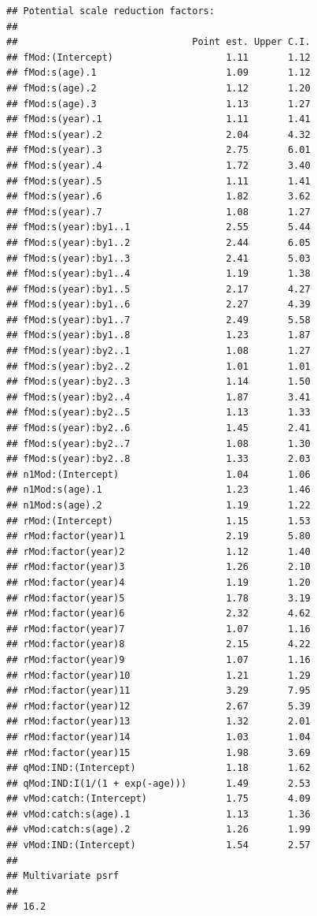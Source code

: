 \documentclass[
]{book}
\begin{document}
\begin{verbatim}
## Potential scale reduction factors:
## 
##                               Point est. Upper C.I.
## fMod:(Intercept)                    1.11       1.12
## fMod:s(age).1                       1.09       1.12
## fMod:s(age).2                       1.12       1.20
## fMod:s(age).3                       1.13       1.27
## fMod:s(year).1                      1.11       1.41
## fMod:s(year).2                      2.04       4.32
## fMod:s(year).3                      2.75       6.01
## fMod:s(year).4                      1.72       3.40
## fMod:s(year).5                      1.11       1.41
## fMod:s(year).6                      1.82       3.62
## fMod:s(year).7                      1.08       1.27
## fMod:s(year):by1..1                 2.55       5.44
## fMod:s(year):by1..2                 2.44       6.05
## fMod:s(year):by1..3                 2.41       5.03
## fMod:s(year):by1..4                 1.19       1.38
## fMod:s(year):by1..5                 2.17       4.27
## fMod:s(year):by1..6                 2.27       4.39
## fMod:s(year):by1..7                 2.49       5.58
## fMod:s(year):by1..8                 1.23       1.87
## fMod:s(year):by2..1                 1.08       1.27
## fMod:s(year):by2..2                 1.01       1.01
## fMod:s(year):by2..3                 1.14       1.50
## fMod:s(year):by2..4                 1.87       3.41
## fMod:s(year):by2..5                 1.13       1.33
## fMod:s(year):by2..6                 1.45       2.41
## fMod:s(year):by2..7                 1.08       1.30
## fMod:s(year):by2..8                 1.33       2.03
## n1Mod:(Intercept)                   1.04       1.06
## n1Mod:s(age).1                      1.23       1.46
## n1Mod:s(age).2                      1.19       1.22
## rMod:(Intercept)                    1.15       1.53
## rMod:factor(year)1                  2.19       5.80
## rMod:factor(year)2                  1.12       1.40
## rMod:factor(year)3                  1.26       2.10
## rMod:factor(year)4                  1.19       1.20
## rMod:factor(year)5                  1.78       3.19
## rMod:factor(year)6                  2.32       4.62
## rMod:factor(year)7                  1.07       1.16
## rMod:factor(year)8                  2.15       4.22
## rMod:factor(year)9                  1.07       1.16
## rMod:factor(year)10                 1.21       1.29
## rMod:factor(year)11                 3.29       7.95
## rMod:factor(year)12                 2.67       5.39
## rMod:factor(year)13                 1.32       2.01
## rMod:factor(year)14                 1.03       1.04
## rMod:factor(year)15                 1.98       3.69
## qMod:IND:(Intercept)                1.18       1.62
## qMod:IND:I(1/(1 + exp(-age)))       1.49       2.53
## vMod:catch:(Intercept)              1.75       4.09
## vMod:catch:s(age).1                 1.13       1.36
## vMod:catch:s(age).2                 1.26       1.99
## vMod:IND:(Intercept)                1.54       2.57
## 
## Multivariate psrf
## 
## 16.2
\end{verbatim}
\end{document}
